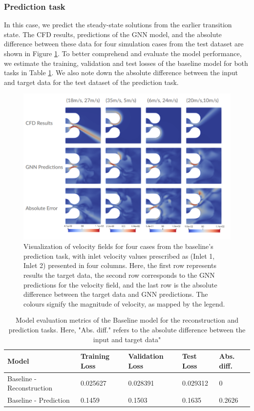 \subsubsection{Prediction task}
In this case, we predict the steady-state solutions from the earlier transition state. The CFD results, predictions of the GNN model, and the absolute difference between these data for four simulation cases from the test dataset are shown in Figure \ref{blpred}. To better comprehend and evaluate the model performance, we estimate the training, validation and test losses of the baseline model for both tasks in Table \ref{table:perform}. We also note down the absolute difference between the input and target data for the test dataset of the prediction task.   
\begin{figure}[ht]
    \centering
    \includegraphics[width=14cm]{images/Methodology/Baselineprediction.png}
    \caption{Visualization of velocity fields for four cases from the baseline's prediction task, with inlet velocity values prescribed as (Inlet 1, Inlet 2) presented in four columns. Here, the first row represents results the target data, the second row corresponds to the GNN predictions for the velocity field, and the last row is the absolute difference between the target data and GNN predictions. The colours signify the magnitude of velocity, as mapped by the legend.} 
    \label{blpred}
\end{figure}
\begin{table}[ht]
    \centering
    \caption{Model evaluation metrics of the Baseline model for the reconstruction and prediction tasks. Here, "Abs. diff." refers to the absolute difference between the input and target data"} 
    \label{table:perform}
    \begin{tabular}{|l|l|l|l|l|}
    \hline
    \textbf{Model} & \textbf{Training Loss} & \textbf{Validation Loss} & \textbf{Test Loss} & \textbf{Abs. diff.} \\
    \hline
    Baseline - Reconstruction & 0.025627 & 0.028391 & 0.029312 & 0\\
    \hline
    Baseline - Prediction & 0.1459 & 0.1503 & 0.1635 & 0.2626\\
    \hline
    \end{tabular}
    \end{table}  

